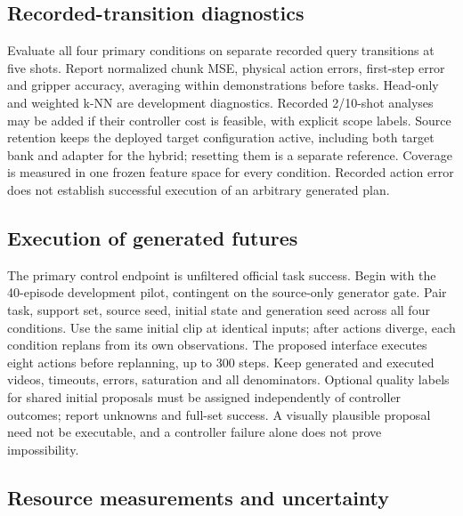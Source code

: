 \documentclass[11pt,a4paper]{article}
\begin{document}
\subsection{Recorded-transition diagnostics}

Evaluate all four primary conditions on separate recorded query transitions at five shots. Report normalized chunk MSE, physical action errors, first-step error and gripper accuracy, averaging within demonstrations before tasks. Head-only and weighted k-NN are development diagnostics. Recorded 2/10-shot analyses may be added if their controller cost is feasible, with explicit scope labels. Source retention keeps the deployed target configuration active, including both target bank and adapter for the hybrid; resetting them is a separate reference. Coverage is measured in one frozen feature space for every condition. Recorded action error does not establish successful execution of an arbitrary generated plan.

\subsection{Execution of generated futures}

The primary control endpoint is unfiltered official task success. Begin with the 40-episode development pilot, contingent on the source-only generator gate. Pair task, support set, source seed, initial state and generation seed across all four conditions. Use the same initial clip at identical inputs; after actions diverge, each condition replans from its own observations. The proposed interface executes eight actions before replanning, up to 300 steps. Keep generated and executed videos, timeouts, errors, saturation and all denominators. Optional quality labels for shared initial proposals must be assigned independently of controller outcomes; report unknowns and full-set success. A visually plausible proposal need not be executable, and a controller failure alone does not prove impossibility.

\subsection{Resource measurements and uncertainty}
\end{document}
